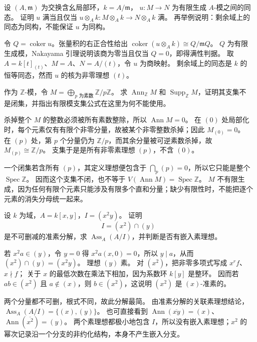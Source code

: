 \begin{exercise}\label{g5:ex:generators-after-residue}
	设 \((A,\mathfrak m)\) 为交换含幺局部环，\(k=A/\mathfrak m\)， \(u:M\to N\) 为有限生成 \(A\)-模之间的同态。 证明 \(u\) 满当且仅当 \(u\otimes_A k:M\otimes_Ak\to N\otimes_Ak\) 满。 再举例说明：剩余域上的同态为同构，不能保证 \(u\) 为同构。
\end{exercise}
\begin{solution}
	令 \(Q=\operatorname{coker}u\)。张量积的右正合性给出 \(\operatorname{coker}(u\otimes_Ak)\cong Q/\mathfrak mQ\)。 \(Q\) 为有限生成模，Nakayama 引理说明该商为零当且仅当 \(Q=0\)，即得满性判据。 取 \(A=k[t]_{(t)}\)、\(M=A\)、\(N=A/(t)\)，令 \(u\) 为商映射。 剩余域上的同态是 \(k\) 的恒等同态，然而 \(u\) 的核为非零理想 \((t)\)。
\end{solution}

\begin{exercise}\label{g5:ex:support-without-finiteness}
	作为 \(\mathbb Z\)-模，令 \(M=\bigoplus_{p\text{ 为素数}}\mathbb Z/p\mathbb Z\)。 求 \(\operatorname{Ann}_{\mathbb Z}M\) 和 \(\operatorname{Supp}_{\mathbb Z}M\)，证明其支集不是闭集，并指出有限模支集公式在这里为何不能使用。
\end{exercise}
\begin{solution}
	杀掉整个 \(M\) 的整数必须被所有素数整除，所以 \(\operatorname{Ann}M=0\)。 在 \((0)\) 处局部化时，每个元素仅有有限个非零分量，故被某个非零整数杀掉；因此 \(M_{(0)}=0\)。 在 \((p)\) 处，第 \(p\) 个分量仍为 \(\mathbb Z/p\)，而其余分量被可逆素数杀掉，故 \(M_{(p)}\cong\mathbb Z/p\)。 支集于是是所有非零素理想 \((p)\)，不含 \((0)\)。

	一个闭集若含所有 \((p)\)，其定义理想便包含于 \(\bigcap_p(p)=0\)，所以它只能是整个 \(\operatorname{Spec}\mathbb Z\)。 因而这个支集不闭，也不等于 \(V(\operatorname{Ann}M)=\operatorname{Spec}\mathbb Z\)。 \(M\) 不有限生成，因为任何有限个元素只能涉及有限多个直和分量；缺少有限性时，不能把逐个元素的消失分母统一起来。
\end{solution}

\begin{exercise}\label{g5:ex:primary-product-powers}
	设 \(k\) 为域，\(A=k[x,y]\)，\(I=(x^2y)\)。 证明
	\[
	I=(x^2)\cap(y)
	\]
	是不可删减的准素分解，求 \(\operatorname{Ass}_A(A/I)\)，并判断是否有嵌入素理想。
\end{exercise}
\begin{solution}
	若 \(x^2a\in(y)\)，令 \(y=0\) 得 \(x^2a(x,0)=0\)，所以 \(y\mid a\)，从而 \((x^2)\cap(y)=(x^2y)\)。 理想 \((y)\) 素。 对 \((x^2)\)，把非零多项式写成 \(x^rf\)、\(x\nmid f\)； 关于 \(x\) 的最低次数在乘法下相加，因为系数环 \(k[y]\) 是整环。 因而若 \(ab\in(x^2)\) 且 \(a\notin(x)\)，则 \(b\in(x^2)\)，这说明 \((x^2)\) 是 \((x)\)-准素的。

	两个分量都不可删，根式不同，故此分解最简。 由准素分解的关联素理想结论， \(\operatorname{Ass}_A(A/I)=\{(x),(y)\}\)。 也可直接看到 \(\operatorname{Ann}(\overline{xy})=(x)\)、 \(\operatorname{Ann}(\overline{x^2})=(y)\)。 两个素理想都极小地包含 \(I\)，所以没有嵌入素理想；\(x^2\) 的幂次记录沿一个分支的非约化结构，本身不产生嵌入分支。
\end{solution}

